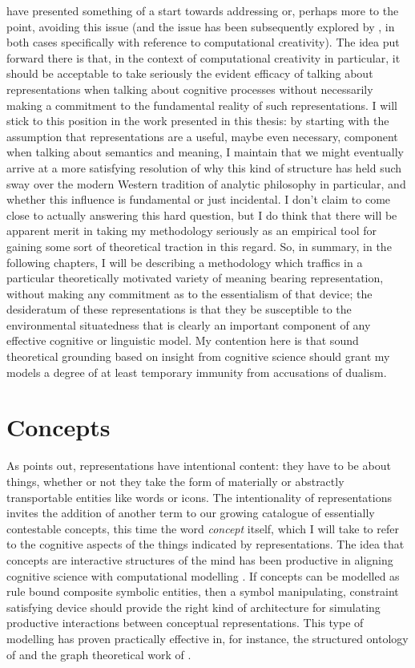\cite{McGregorEA2014} have presented something of a start towards addressing or, perhaps more to the point, avoiding this issue (and the issue has been subsequently explored by \cite{Coeckelbergh2016}, in both cases specifically with reference to computational creativity).  The idea put forward there is that, in the context of computational creativity in particular, it should be acceptable to take seriously the evident efficacy of talking about representations when talking about cognitive processes without necessarily making a commitment to the fundamental reality of such representations.  I will stick to this position in the work presented in this thesis: by starting with the assumption that representations are a useful, maybe even necessary, component when talking about semantics and meaning, I maintain that we might eventually arrive at a more satisfying resolution of why this kind of structure has held such sway over the modern Western tradition of analytic philosophy in particular, and whether this influence is fundamental or just incidental.  I don't claim to come close to actually answering this hard question, but I do think that there will be apparent merit in taking my methodology seriously as an empirical tool for gaining some sort of theoretical traction in this regard.  So, in summary, in the following chapters, I will be describing a methodology which traffics in a particular theoretically motivated variety of meaning bearing representation, without making any commitment as to the essentialism of that device; the desideratum of these representations is that they be susceptible to the environmental situatedness that is clearly an important component of any effective cognitive or linguistic model.  My contention here is that sound theoretical grounding based on insight from cognitive science should grant my models a degree of at least temporary immunity from accusations of dualism.

\section{Concepts} \label{sec:concepts}
As \cite{Searle1983b} points out, representations have intentional content: they have to be about things, whether or not they take the form of materially or abstractly transportable entities like words or icons.  The intentionality of representations invites the addition of another term to our growing catalogue of essentially contestable concepts, this time the word \emph{concept} itself, which I will take to refer to the cognitive aspects of the things indicated by representations.  The idea that concepts are interactive structures of the mind \citep{MargolisEA2007,Fodor2008} has been productive in aligning cognitive science with computational modelling \citep{Boden2006}.  If concepts can be modelled as rule bound composite symbolic entities, then a symbol manipulating, constraint satisfying device should provide the right kind of architecture for simulating productive interactions between conceptual representations.  This type of modelling has proven practically effective in, for instance, the structured ontology of \cite{Lenat1995} and the graph theoretical work of \cite{Sowa2006}.


